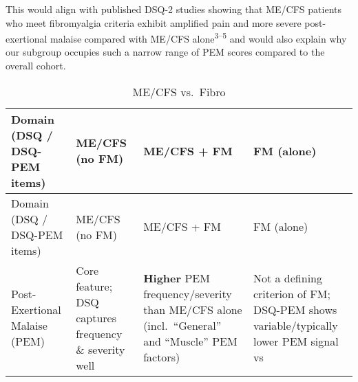 \documentclass[
  letterpaper,
  DIV=11,
  numbers=noendperiod]{scrartcl}
\begin{document}
This would align with published DSQ-2 studies showing that ME/CFS
patients who meet fibromyalgia criteria exhibit amplified pain and more
severe post-exertional malaise compared with ME/CFS
alone\textsuperscript{3--5} and would also explain why our subgroup
occupies such a narrow range of PEM scores compared to the overall
cohort.

\bigskip

\begin{longtable}[]{@{}
  >{\raggedright\arraybackslash}p{}
  >{\raggedright\arraybackslash}p{}
  >{\raggedright\arraybackslash}p{}
  >{\raggedright\arraybackslash}p{}@{}}
\caption{ME/CFS vs.~Fibro}\label{tbl-t3}\tabularnewline
\toprule\noalign{}
\begin{minipage}[b]{\linewidth}\raggedright
Domain (DSQ / DSQ-PEM items)
\end{minipage} & \begin{minipage}[b]{\linewidth}\raggedright
ME/CFS (no FM)
\end{minipage} & \begin{minipage}[b]{\linewidth}\raggedright
ME/CFS + FM
\end{minipage} & \begin{minipage}[b]{\linewidth}\raggedright
FM (alone)
\end{minipage} \\
\midrule\noalign{}
\endfirsthead
\toprule\noalign{}
\begin{minipage}[b]{\linewidth}\raggedright
Domain (DSQ / DSQ-PEM items)
\end{minipage} & \begin{minipage}[b]{\linewidth}\raggedright
ME/CFS (no FM)
\end{minipage} & \begin{minipage}[b]{\linewidth}\raggedright
ME/CFS + FM
\end{minipage} & \begin{minipage}[b]{\linewidth}\raggedright
FM (alone)
\end{minipage} \\
\midrule\noalign{}
\endhead
\bottomrule\noalign{}
\endlastfoot
Post-Exertional Malaise (PEM) & Core feature; DSQ captures frequency \&
severity well & \textbf{Higher} PEM frequency/severity than ME/CFS alone
(incl.~``General'' and ``Muscle'' PEM factors) & Not a defining
criterion of FM; DSQ-PEM shows variable/typically lower PEM signal vs

\end{longtable}
\end{document}
